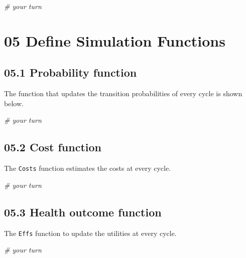 \documentclass[
]{article}
\newenvironment{Shaded}{\begin{snugshade}}{\end{snugshade}}
\newcommand{\CommentTok}[1]{\textcolor[rgb]{0.56,0.35,0.01}{\textit{#1}}}
\begin{document}
\begin{Shaded}
\begin{Highlighting}[]
\CommentTok{# your turn}
\end{Highlighting}
\end{Shaded}

\hypertarget{define-simulation-functions}{%
\section{05 Define Simulation
Functions}\label{define-simulation-functions}}

\hypertarget{probability-function}{%
\subsection{05.1 Probability function}\label{probability-function}}

The function that updates the transition probabilities of every cycle is
shown below.

\begin{Shaded}
\begin{Highlighting}[]
\CommentTok{# your turn}
\end{Highlighting}
\end{Shaded}

\hypertarget{cost-function}{%
\subsection{05.2 Cost function}\label{cost-function}}

The \texttt{Costs} function estimates the costs at every cycle.

\begin{Shaded}
\begin{Highlighting}[]
\CommentTok{# your turn}
\end{Highlighting}
\end{Shaded}

\hypertarget{health-outcome-function}{%
\subsection{05.3 Health outcome
function}\label{health-outcome-function}}

The \texttt{Effs} function to update the utilities at every cycle.

\begin{Shaded}
\begin{Highlighting}[]
\CommentTok{# your turn}
\end{Highlighting}
\end{Shaded}
\end{document}
